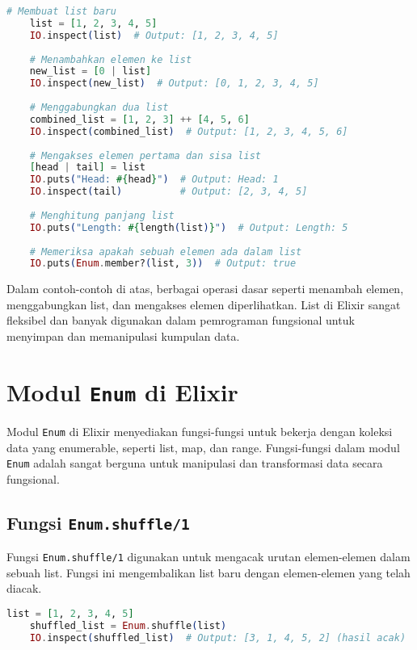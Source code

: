 \begin{lstlisting}[language=Elixir]
	# Membuat list baru
	list = [1, 2, 3, 4, 5]
	IO.inspect(list)  # Output: [1, 2, 3, 4, 5]
	
	# Menambahkan elemen ke list
	new_list = [0 | list]
	IO.inspect(new_list)  # Output: [0, 1, 2, 3, 4, 5]
	
	# Menggabungkan dua list
	combined_list = [1, 2, 3] ++ [4, 5, 6]
	IO.inspect(combined_list)  # Output: [1, 2, 3, 4, 5, 6]
	
	# Mengakses elemen pertama dan sisa list
	[head | tail] = list
	IO.puts("Head: #{head}")  # Output: Head: 1
	IO.inspect(tail)          # Output: [2, 3, 4, 5]
	
	# Menghitung panjang list
	IO.puts("Length: #{length(list)}")  # Output: Length: 5
	
	# Memeriksa apakah sebuah elemen ada dalam list
	IO.puts(Enum.member?(list, 3))  # Output: true
\end{lstlisting}

Dalam contoh-contoh di atas, berbagai operasi dasar seperti menambah elemen, menggabungkan list, dan mengakses elemen diperlihatkan. List di Elixir sangat fleksibel dan banyak digunakan dalam pemrograman fungsional untuk menyimpan dan memanipulasi kumpulan data.

\section{Modul \texttt{Enum} di Elixir}

Modul \texttt{Enum} di Elixir menyediakan fungsi-fungsi untuk bekerja dengan koleksi data yang enumerable, seperti list, map, dan range. Fungsi-fungsi dalam modul \texttt{Enum} adalah sangat berguna untuk manipulasi dan transformasi data secara fungsional.

\subsection{Fungsi \texttt{Enum.shuffle/1}}

Fungsi \texttt{Enum.shuffle/1} digunakan untuk mengacak urutan elemen-elemen dalam sebuah list. Fungsi ini mengembalikan list baru dengan elemen-elemen yang telah diacak.

\begin{lstlisting}[language=Elixir]
	list = [1, 2, 3, 4, 5]
	shuffled_list = Enum.shuffle(list)
	IO.inspect(shuffled_list)  # Output: [3, 1, 4, 5, 2] (hasil acak)
\end{lstlisting}

